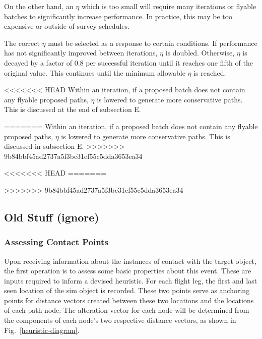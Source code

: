 \documentclass[conf]{new-aiaa}
\begin{document}
On the other hand, an $\eta$ which is too small will require many iterations or flyable batches to significantly increase performance. In practice, this may be too expensive or outside of survey schedules.

The correct $\eta$ must be selected as a response to certain conditions. If performance has not significantly improved between iterations, $\eta$ is doubled. Otherwise, $\eta$ is decayed by a factor of 0.8 per successful iteration until it reaches one fifth of the original value. This continues until the minimum allowable $\eta$ is reached.

<<<<<<< HEAD
Within an iteration, if a proposed batch does not contain any flyable proposed paths, $\eta$ is lowered to generate more conservative paths. This is discussed at the end of subsection E.



=======
Within an iteration, if a proposed batch does not contain any flyable proposed paths, $\eta$ is lowered to generate more conservative paths. This is discussed in subsection E.
>>>>>>> 9b84bbf45ad2737a5f3bc31ef55c5dda3653ea34









<<<<<<< HEAD
=======



>>>>>>> 9b84bbf45ad2737a5f3bc31ef55c5dda3653ea34
\iffalse


\subsection{Old Stuff (ignore)}
\subsubsection{Assessing Contact Points}
Upon receiving information about the instances of contact with the target object, the first operation is to assess some basic properties about this event. These are inputs required to inform a devised heuristic. For each flight leg, the first and last seen location of the sim object is recorded. These two points serve as anchoring points for distance vectors created between these two locations and the locations of each path node. The alteration vector for each node will be determined from the components of each node's two respective distance vectors, as shown in Fig.~\ref{heuristic-diagram}.
\end{document}
